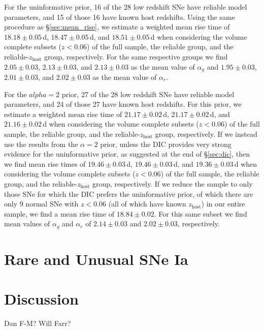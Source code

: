 \documentclass[twocolumn]{./aastex63}
\begin{document}
For the uninformative prior, 16 of the 28 low redshift SNe have reliable model
parameters, and 15 of those 16 have known host redshifts. Using the same
procedure as \S\ref{sec:mean_rise}, we estimate a weighted mean rise time of
$18.18 \pm 0.05$\,d, $18.47 \pm 0.05$\,d, and $18.51 \pm 0.05$\,d when
considering the volume complete subsets ($z < 0.06$) of the full sample, the
reliable group, and the reliable-$z_\mathrm{host}$ group, respectively. For
the same respective groups we find $2.05 \pm 0.03$, $2.13 \pm 0.03$, and $2.13
\pm 0.03$ as the mean value of $\alpha_g$ and $1.95 \pm 0.03$, $2.01 \pm
0.03$, and $2.02 \pm 0.03$ as the mean value of $\alpha_r$.

For the $alpha = 2$ prior, 27 of the 28 low redshift SNe have reliable model
parameters, and 24 of those 27 have known host redshifts. For this prior, we
estimate a weighted mean rise time of $21.17 \pm 0.02$\,d, $21.17 \pm
0.02$\,d, and $21.16 \pm 0.02$\,d when considering the volume complete subsets
($z < 0.06$) of the full sample, the reliable group, and the
reliable-$z_\mathrm{host}$ group, respectively. If we instead use the results
from the $\alpha = 2$ prior, unless the DIC provides very strong evidence for
the uninformative prior, as suggested at the end of \S\ref{sec:dic}, then we
find mean rise times of $19.46 \pm 0.03$\,d, $19.46 \pm 0.03$\,d, and $19.36
\pm 0.03$\,d when considering the volume complete subsets ($z < 0.06$) of the
full sample, the reliable group, and the reliable-$z_\mathrm{host}$ group,
respectively. If we reduce the sample to only those SNe for which the DIC
prefers the uninformative prior, of which there are only 9 normal SNe with $z
< 0.06$ (all of which have known $z_\mathrm{host}$) in our entire sample, we
find a mean rise time of $18.84 \pm 0.02$. For this same subset we find mean
values of $\alpha_g$ and $\alpha_r$ of $2.14 \pm 0.03$ and $2.02 \pm 0.03$,
respectively.

\section{Rare and Unusual SNe Ia}

\section{Discussion}


\acknowledgements

Dan F-M? Will Farr?

\end{document}
